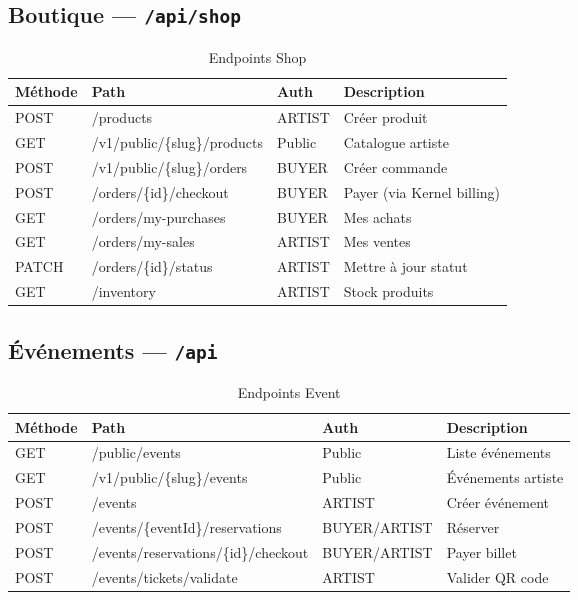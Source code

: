 \subsection{Boutique — \texttt{/api/shop}}

\begin{longtable}{@{}llll@{}}
  \caption{Endpoints Shop} \label{tab:api-shop} \\
  \toprule
  \textbf{Méthode} & \textbf{Path} & \textbf{Auth} & \textbf{Description} \\
  \midrule
  \endfirsthead
  POST  & /products                              & ARTIST & Créer produit \\
  GET   & /v1/public/\{slug\}/products            & Public & Catalogue artiste \\
  POST  & /v1/public/\{slug\}/orders              & BUYER  & Créer commande \\
  POST  & /orders/\{id\}/checkout                  & BUYER  & Payer (via Kernel billing) \\
  GET   & /orders/my-purchases                   & BUYER  & Mes achats \\
  GET   & /orders/my-sales                       & ARTIST & Mes ventes \\
  PATCH & /orders/\{id\}/status                    & ARTIST & Mettre à jour statut \\
  GET   & /inventory                             & ARTIST & Stock produits \\
  \bottomrule
\end{longtable}

\subsection{Événements — \texttt{/api}}

\begin{longtable}{@{}llll@{}}
  \caption{Endpoints Event} \label{tab:api-event} \\
  \toprule
  \textbf{Méthode} & \textbf{Path} & \textbf{Auth} & \textbf{Description} \\
  \midrule
  \endfirsthead
  GET    & /public/events                          & Public       & Liste événements \\
  GET    & /v1/public/\{slug\}/events                 & Public       & Événements artiste \\
  POST   & /events                                 & ARTIST       & Créer événement \\
  POST   & /events/\{eventId\}/reservations          & BUYER/ARTIST & Réserver \\
  POST   & /events/reservations/\{id\}/checkout      & BUYER/ARTIST & Payer billet \\
  POST   & /events/tickets/validate                & ARTIST       & Valider QR code \\
  \bottomrule
\end{longtable}


